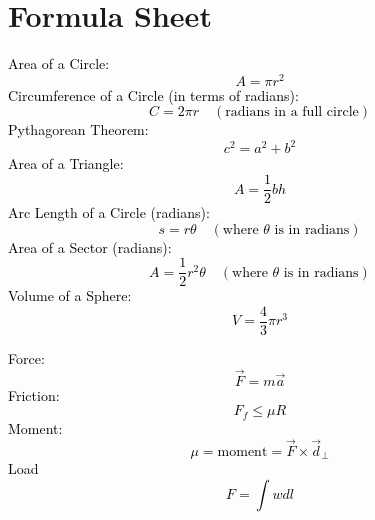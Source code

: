 \section{Formula Sheet}
\setcounter{equation}{0}
\newcommand{\mybox}[2]{
    \begin{tcolorbox}[colback=lightblue!5!white,colframe=lightblue!75!black,boxsep=1pt,arc=0pt,outer arc=0pt,title={\textcolor{black}{#1}}]
        \textcolor{black}{#2}
    \end{tcolorbox}
}


\begin{multicols}{2}
\mybox{Geometry}{
Area of a Circle:
\begin{equation}
    A = \pi r^2
\end{equation}
Circumference of a Circle (in terms of radians):
\begin{equation}
    C = 2\pi r \quad (\text{radians in a full circle})
\end{equation}
Pythagorean Theorem:
\begin{equation}
    c^2 = a^2 + b^2
\end{equation}
Area of a Triangle:
\begin{equation}
    A = \frac{1}{2} b h
\end{equation}
Arc Length of a Circle (radians):
\begin{equation}
    s = r \theta \quad (\text{where } \theta \text{ is in radians})
\end{equation}
Area of a Sector (radians):
\begin{equation}
    A = \frac{1}{2} r^2 \theta \quad (\text{where } \theta \text{ is in radians})
\end{equation}
Volume of a Sphere:
\begin{equation}
    V = \frac{4}{3} \pi r^3
\end{equation}
}

\mybox{Forces}{
Force:
\begin{equation}
    \Vec{F}=m\Vec{a}
\end{equation}
Friction:
\begin{equation}
    F_f\le \mu R
\end{equation}
Moment:
\begin{equation}
    \mu = \text{moment} =\Vec{F} \times \Vec{d}_\perp
\end{equation}
Load
\begin{equation}
     F=\int wdl 
\end{equation}
}


\end{multicols}
